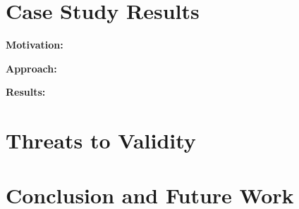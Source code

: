 \section{Case Study Results}
\label{chap3:sec:results}

\vspace{3mm}
\noindent\chapterIIIrqi
\vspace{3mm}

\noindent\textbf{Motivation:} 

\vspace{1mm}
\noindent\textbf{Approach:} 

\vspace{1mm}
\noindent\textbf{Results:} 


\section{Threats to Validity}
\label{chap3:sec:threats_to_validity}

\section{Conclusion and Future Work}
\label{chap3:sec:conclusion}